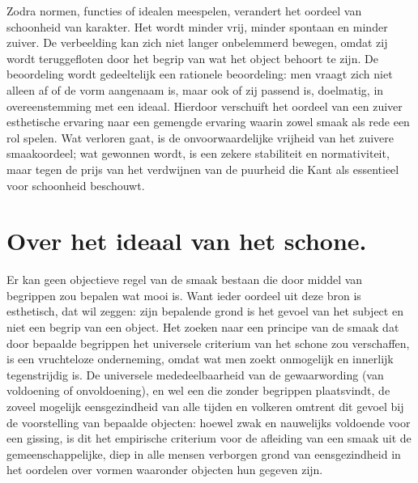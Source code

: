 \begin{mdframed}[leftmargin=0pt,rightmargin=0pt,backgroundcolor=blue!6,linecolor=white,innertopmargin=6pt,innerbottommargin=6pt]
Zodra normen, functies of idealen meespelen, verandert het oordeel van schoonheid van karakter. Het wordt minder vrij, minder spontaan en minder zuiver. De verbeelding kan zich niet langer onbelemmerd bewegen, omdat zij wordt teruggefloten door het begrip van wat het object behoort te zijn. De beoordeling wordt gedeeltelijk een rationele beoordeling: men vraagt zich niet alleen af of de vorm aangenaam is, maar ook of zij passend is, doelmatig, in overeenstemming met een ideaal. Hierdoor verschuift het oordeel van een zuiver esthetische ervaring naar een gemengde ervaring waarin zowel smaak als rede een rol spelen. Wat verloren gaat, is de onvoorwaardelijke vrijheid van het zuivere smaakoordeel; wat gewonnen wordt, is een zekere stabiliteit en normativiteit, maar tegen de prijs van het verdwijnen van de puurheid die Kant als essentieel voor schoonheid beschouwt.
\end{mdframed}

\section{Over het ideaal van het schone.} %

Er kan geen objectieve regel van de smaak bestaan die door middel van begrippen zou bepalen wat mooi is. Want ieder oordeel uit deze bron is esthetisch, dat wil zeggen: zijn bepalende grond is het gevoel van het subject en niet een begrip van een object. Het zoeken naar een principe van de smaak dat door bepaalde begrippen het universele criterium van het schone zou verschaffen, is een vruchteloze onderneming, omdat wat men zoekt onmogelijk en innerlijk tegenstrijdig is. De universele mededeelbaarheid van de gewaarwording (van voldoening of onvoldoening), en wel een die zonder begrippen plaatsvindt, de zoveel mogelijk eensgezindheid van alle tijden en volkeren omtrent dit gevoel bij de voorstelling van bepaalde objecten: hoewel zwak en nauwelijks voldoende voor een gissing, is dit het empirische criterium voor de afleiding van een smaak uit de gemeenschappelijke, diep in alle mensen verborgen grond van eensgezindheid in het oordelen over vormen waaronder objecten hun gegeven zijn.

